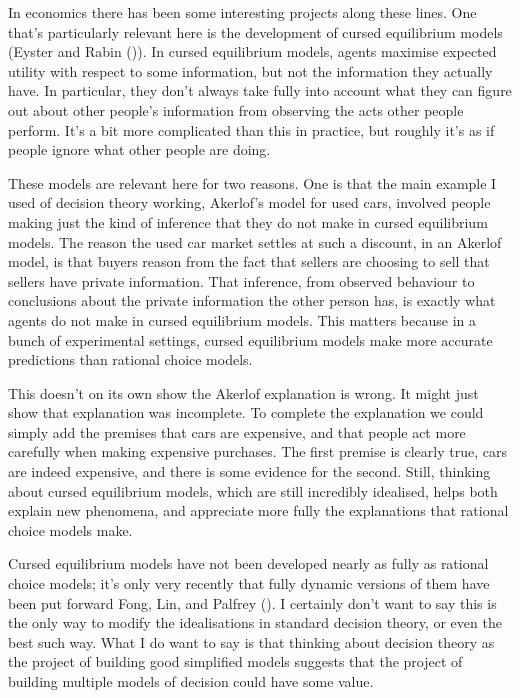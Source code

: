 \documentclass[
  10pt,
  letterpaper,
  DIV=11,
  numbers=noendperiod,
  twoside]{scrartcl}
\begin{document}
In economics there has been some interesting projects along these lines.
One that's particularly relevant here is the development of cursed
equilibrium models (Eyster and Rabin
()). In cursed equilibrium models,
agents maximise expected utility with respect to some information, but
not the information they actually have. In particular, they don't always
take fully into account what they can figure out about other people's
information from observing the acts other people perform. It's a bit
more complicated than this in practice, but roughly it's as if people
ignore what other people are doing.

These models are relevant here for two reasons. One is that the main
example I used of decision theory working, Akerlof's model for used
cars, involved people making just the kind of inference that they do not
make in cursed equilibrium models. The reason the used car market
settles at such a discount, in an Akerlof model, is that buyers reason
from the fact that sellers are choosing to sell that sellers have
private information. That inference, from observed behaviour to
conclusions about the private information the other person has, is
exactly what agents do not make in cursed equilibrium models. This
matters because in a bunch of experimental settings, cursed equilibrium
models make more accurate predictions than rational choice models.

This doesn't on its own show the Akerlof explanation is wrong. It might
just show that explanation was incomplete. To complete the explanation
we could simply add the premises that cars are expensive, and that
people act more carefully when making expensive purchases. The first
premise is clearly true, cars are indeed expensive, and there is some
evidence for the second. Still, thinking about cursed equilibrium
models, which are still incredibly idealised, helps both explain new
phenomena, and appreciate more fully the explanations that rational
choice models make.

Cursed equilibrium models have not been developed nearly as fully as
rational choice models; it's only very recently that fully dynamic
versions of them have been put forward Fong, Lin, and Palfrey
(). I certainly don't want to say this is
the only way to modify the idealisations in standard decision theory, or
even the best such way. What I do want to say is that thinking about
decision theory as the project of building good simplified models
suggests that the project of building multiple models of decision could
have some value.
\end{document}
